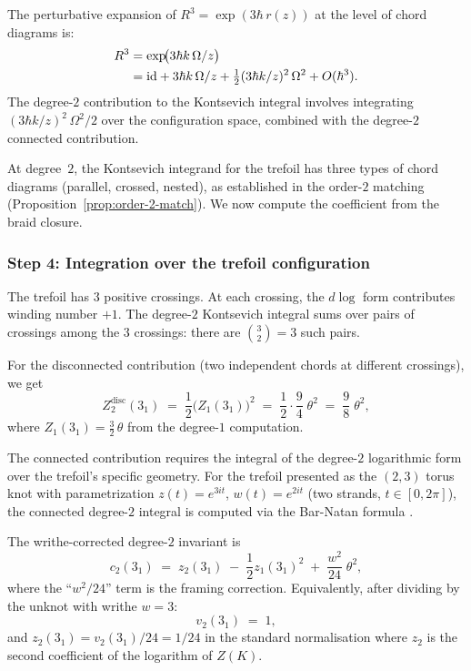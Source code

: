 \documentclass[11pt]{article}
\newcommand{\id}{\mathrm{id}}
\begin{document}
The perturbative expansion of $R^3 = \exp(3\hbar\,r(z))$ at the
level of chord diagrams is:
\begin{align}
  R^3
  &= \exp\!\bigl(3\hbar k\,\Omega/z\bigr)
  \notag\\
  &= \id
  + 3\hbar k\,\Omega/z
  + \tfrac{1}{2}(3\hbar k/z)^2\,\Omega^2
  + O(\hbar^3).
  \label{eq:R-cubed-expansion}
\end{align}
The degree-$2$ contribution to the Kontsevich integral involves
integrating $(3\hbar k/z)^2\,\Omega^2/2$ over the
configuration space, combined with the degree-$2$ connected
contribution.

At degree~$2$, the Kontsevich integrand for the trefoil has
three types of chord diagrams (parallel, crossed, nested),
as established in the order-$2$ matching (Proposition~\ref{prop:order-2-match}).  We now
compute the coefficient from the braid closure.

\subsubsection{Step 4: Integration over the trefoil configuration}

The trefoil has $3$ positive crossings.  At each crossing, the
$d\log$ form contributes winding number $+1$.  The degree-$2$
Kontsevich integral sums over pairs of crossings among the $3$
crossings: there are $\binom{3}{2} = 3$ such pairs.

For the disconnected contribution (two independent chords at
different crossings), we get
\begin{equation}\label{eq:degree-2-disconnected}
  Z_2^{\mathrm{disc}}(3_1)
  \;=\;
  \frac{1}{2}\bigl(Z_1(3_1)\bigr)^2
  \;=\;
  \frac{1}{2}\cdot\frac{9}{4}\;\theta^2
  \;=\;
  \frac{9}{8}\;\theta^2,
\end{equation}
where $Z_1(3_1) = \frac{3}{2}\,\theta$ from the degree-$1$ computation.

The connected contribution requires the integral of the
degree-$2$ logarithmic form over the trefoil's specific geometry.
For the trefoil presented as the $(2,3)$ torus knot with
parametrization $z(t) = e^{3it}$, $w(t) = e^{2it}$
(two strands, $t \in [0, 2\pi]$), the connected degree-$2$
integral is computed via the Bar-Natan formula
\cite{BarNatan95}.

\begin{computation}
\label{comp:degree-2-trefoil}

The writhe-corrected degree-$2$ invariant is
\begin{equation}\label{eq:c2-trefoil}
  c_2(3_1)
  \;=\;
  z_2(3_1)
  \;-\;
  \frac{1}{2}z_1(3_1)^2
  \;+\;
  \frac{w^2}{24}\;\theta^2,
\end{equation}
where the ``$w^2/24$'' term is the framing correction.
Equivalently, after dividing by the unknot with writhe $w = 3$:
\begin{equation}\label{eq:z2-from-v2}
  v_2(3_1) \;=\; 1,
\end{equation}
and $z_2(3_1) = v_2(3_1)/24 = 1/24$ in the
standard normalisation where $z_2$ is the second coefficient
of the logarithm of $Z(K)$.
\end{computation}
\end{document}
